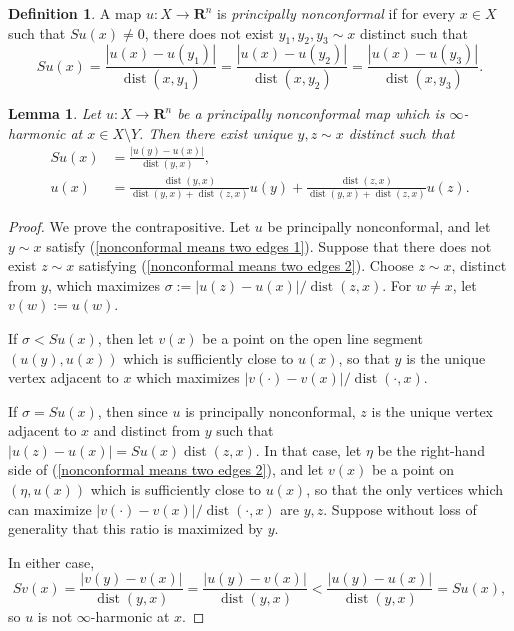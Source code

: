 \documentclass[reqno,11pt]{amsart}
\newcommand{\RR}{\mathbf{R}}
\DeclareMathOperator{\dist}{dist}
\newcommand{\dfn}[1]{\emph{#1}\index{#1}}
\newtheorem{lemma}[theorem]{Lemma}
\theoremstyle{definition}
\newtheorem{definition}[theorem]{Definition}
\numberwithin{equation}{section}
\begin{document}
\begin{definition}
A map $u: X \to \RR^n$ is \dfn{principally nonconformal} if for every $x \in X$ such that $Su(x) \neq 0$, there does not exist $y_1, y_2, y_3 \sim x$ distinct such that
$$Su(x) = \frac{|u(x) - u(y_1)|}{\dist(x, y_1)} = \frac{|u(x) - u(y_2)|}{\dist(x, y_2)} = \frac{|u(x) - u(y_3)|}{\dist(x, y_3)}.$$
\end{definition}

\begin{lemma}\label{dynamic programming principle}
Let $u: X \to \RR^n$ be a principally nonconformal map which is $\infty$-harmonic at $x \in X \setminus Y$.
Then there exist unique $y, z \sim x$ distinct such that 
\begin{align}
Su(x) &= \frac{|u(y) - u(x)|}{\dist(y, x)} \label{nonconformal means two edges 1}, \\
u(x) &= \frac{\dist(y, x)}{\dist(y, x) + \dist(z, x)} u(y) + \frac{\dist(z, x)}{\dist(y, x) + \dist(z, x)} u(z) \label{nonconformal means two edges 2}.
\end{align}
\end{lemma}
\begin{proof}
We prove the contrapositive.
Let $u$ be principally nonconformal, and let $y \sim x$ satisfy (\ref{nonconformal means two edges 1}).
Suppose that there does not exist $z \sim x$ satisfying (\ref{nonconformal means two edges 2}).
Choose $z \sim x$, distinct from $y$, which maximizes $\sigma := |u(z) - u(x)|/\dist(z, x)$.
For $w \neq x$, let $v(w) := u(w)$.

If $\sigma < Su(x)$, then let $v(x)$ be a point on the open line segment $(u(y), u(x))$ which is sufficiently close to $u(x)$, so that $y$ is the unique vertex adjacent to $x$ which maximizes $|v(\cdot) - v(x)|/\dist(\cdot, x)$.

If $\sigma = Su(x)$, then since $u$ is principally nonconformal, $z$ is the unique vertex adjacent to $x$ and distinct from $y$ such that $|u(z) - u(x)| = Su(x) \dist(z, x)$.
In that case, let $\eta$ be the right-hand side of (\ref{nonconformal means two edges 2}), and let $v(x)$ be a point on $(\eta, u(x))$ which is sufficiently close to $u(x)$, so that the only vertices which can maximize $|v(\cdot) - v(x)|/\dist(\cdot, x)$ are $y, z$.
Suppose without loss of generality that this ratio is maximized by $y$.

In either case, 
$$Sv(x) = \frac{|v(y) - v(x)|}{\dist(y, x)} = \frac{|u(y) - v(x)|}{\dist(y, x)} < \frac{|u(y) - u(x)|}{\dist(y, x)} = Su(x),$$
so $u$ is not $\infty$-harmonic at $x$.
\end{proof}
\end{document}
